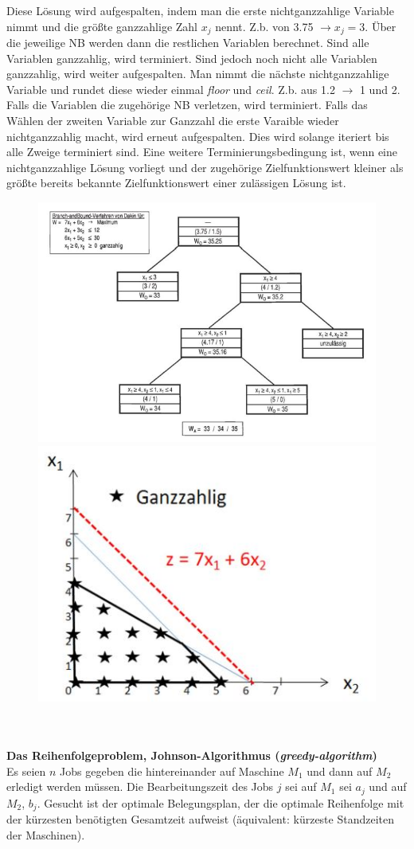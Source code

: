 		Diese Lösung wird aufgespalten, indem man die erste nichtganzzahlige Variable nimmt und die größte ganzzahlige Zahl $ x_{j} $ nennt. Z.b. von 3.75 $ \rightarrow x_{j} = 3 $. Über die jeweilige NB werden dann die restlichen Variablen berechnet. Sind alle Variablen ganzzahlig, wird terminiert. Sind jedoch noch nicht alle Variablen ganzzahlig, wird weiter aufgespalten. Man nimmt die nächste nichtganzzahlige Variable und rundet diese wieder einmal \textit{floor} und \textit{ceil}. Z.b. aus 1.2 $ \rightarrow $ 1 und 2. Falls die Variablen die zugehörige NB verletzen, wird terminiert. Falls das Wählen der zweiten Variable zur Ganzzahl die erste Varaible wieder nichtganzzahlig macht, wird erneut aufgespalten. Dies wird solange iteriert bis alle Zweige terminiert sind. Eine weitere Terminierungsbedingung ist, wenn eine nichtganzzahlige Lösung vorliegt und der zugehörige Zielfunktionswert kleiner als größte bereits bekannte Zielfunktionswert einer zulässigen Lösung ist.
		\begin{figure}[h]
			\centering
			\includegraphics[width=0.7\linewidth]{./pics/ma/dak}
			\includegraphics[width=0.29\linewidth]{./pics/ma/dakd}
		\end{figure}
		\leavevmode \\\\
		\textbf{Das Reihenfolgeproblem, Johnson-Algorithmus (\textit{greedy-algorithm})}\\
		Es seien $ n $ Jobs gegeben die hintereinander auf Maschine $ M_{1} $ und dann auf $ M_{2} $ erledigt werden müssen. Die Bearbeitungszeit des Jobs $ j $ sei auf $ M_{1} $ sei $ a_{j} $ und auf $ M_{2} $, $ b_{j} $. Gesucht ist der optimale Belegungsplan, der die optimale Reihenfolge mit der kürzesten benötigten Gesamtzeit aufweist (äquivalent: kürzeste Standzeiten der Maschinen).\\\\
